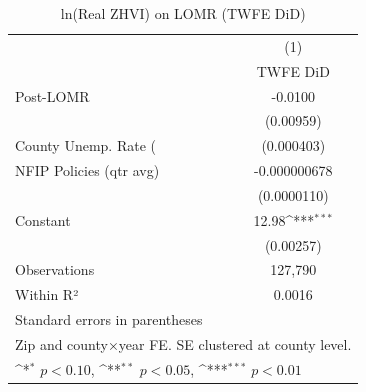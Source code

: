 \begin{table}[htbp]\centering
\def\sym#1{\ifmmode^{#1}\else\(^{#1}\)\fi}
\caption{ln(Real ZHVI) on LOMR (TWFE DiD)}
\begin{tabular}{l*{1}{c}}
\hline\hline
                    &\multicolumn{1}{c}{(1)}\\
                    &\multicolumn{1}{c}{TWFE DiD}\\
\hline
Post-LOMR           &     -0.0100         \\
                    &   (0.00959)         \\
[1em]
County Unemp. Rate (%
                    &  (0.000403)         \\
[1em]
NFIP Policies (qtr avg)&-0.000000678         \\
                    & (0.0000110)         \\
[1em]
Constant            &       12.98\sym{***}\\
                    &   (0.00257)         \\
\hline
Observations        &     127,790         \\
Within R²           &      0.0016         \\
\hline\hline
\multicolumn{2}{l}{\footnotesize Standard errors in parentheses}\\
\multicolumn{2}{l}{\footnotesize Zip and county×year FE. SE clustered at county level.}\\
\multicolumn{2}{l}{\footnotesize \sym{*} \(p<0.10\), \sym{**} \(p<0.05\), \sym{***} \(p<0.01\)}\\
\end{tabular}
\end{table}
